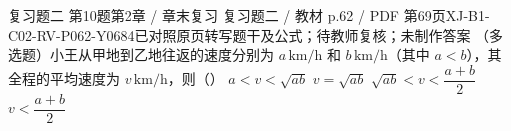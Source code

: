 \par\noindent\begin{minipage}{\linewidth}
\begin{bankitem}{复习题二 第10题}{第2章 / 章末复习 复习题二 / 教材 p.62 / PDF 第69页}{XJ-B1-C02-RV-P062-Y0684}{已对照原页转写题干及公式；待教师复核；未制作答案}
（多选题）小王从甲地到乙地往返的速度分别为 $a\,\mathrm{km/h}$ 和 $b\,\mathrm{km/h}$（其中 $a<b$），其全程的平均速度为 $v\,\mathrm{km/h}$，则（\quad）
$a<v<\sqrt{ab}$
$v=\sqrt{ab}$
$\sqrt{ab}<v<\dfrac{a+b}2$
$v<\dfrac{a+b}2$
\end{bankitem}
\end{minipage}\par\medskip
